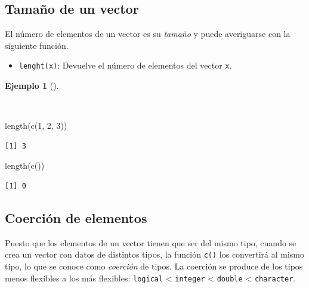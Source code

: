 \documentclass[
  a4paper,
]{scrreport}
\newenvironment{Shaded}{\begin{snugshade}}{\end{snugshade}}
\newcommand{\DecValTok}[1]{\textcolor[rgb]{0.68,0.00,0.00}{#1}}
\newcommand{\FunctionTok}[1]{\textcolor[rgb]{0.28,0.35,0.67}{#1}}
\newcommand{\NormalTok}[1]{\textcolor[rgb]{0.00,0.23,0.31}{#1}}
\providecommand{\tightlist}{%
  \setlength{\itemsep}{0pt}\setlength{\parskip}{0pt}}\usepackage{longtable,booktabs,array}
\theoremstyle{definition}
\theoremstyle{definition}
\newtheorem{example}{Ejemplo}[chapter]
\theoremstyle{remark}
\begin{document}
\subsection{Tamaño de un vector}\label{tamauxf1o-de-un-vector}

El número de elementos de un vector es su \emph{tamaño} y puede
averiguarse con la siguiente función.

\begin{itemize}
\tightlist
\item
  \texttt{lenght(x)}: Devuelve el número de elementos del vector
  \texttt{x}.
\end{itemize}

\begin{example}[]\protect\hypertarget{exm-tamaño-vector}{}\label{exm-tamaño-vector}

~

\begin{Shaded}
\begin{Highlighting}[]
\FunctionTok{length}\NormalTok{(}\FunctionTok{c}\NormalTok{(}\DecValTok{1}\NormalTok{, }\DecValTok{2}\NormalTok{, }\DecValTok{3}\NormalTok{))}
\end{Highlighting}
\end{Shaded}

\begin{verbatim}
[1] 3
\end{verbatim}

\begin{Shaded}
\begin{Highlighting}[]
\FunctionTok{length}\NormalTok{(}\FunctionTok{c}\NormalTok{())}
\end{Highlighting}
\end{Shaded}

\begin{verbatim}
[1] 0
\end{verbatim}

\end{example}

\subsection{Coerción de elementos}\label{coerciuxf3n-de-elementos}

Puesto que los elementos de un vector tienen que ser del mismo tipo,
cuando se crea un vector con datos de distintos tipos, la función
\texttt{c()} los convertirá al mismo tipo, lo que se conoce como
\emph{coerción} de tipos. La coerción se produce de los tipos menos
flexibles a los más flexibles: \texttt{logical} \textless{}
\texttt{integer} \textless{} \texttt{double} \textless{}
\texttt{character}.
\end{document}
